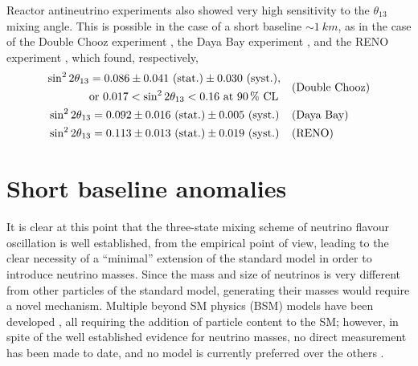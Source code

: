 Reactor antineutrino experiments also showed very high sensitivity to the $\theta_{13}$ mixing angle. This is possible in the case of a short baseline $\sim \SI{1}{km}$, as in the case of the Double Chooz experiment \cite{abeIndicationDisappearanceReactor2012}, the Daya Bay experiment \cite{anObservationElectronantineutrinoDisappearance2012}, and the RENO experiment \cite{kimObservationReactorElectron2012}, which found, respectively, \begin{align}
    &\begin{aligned}
        \sin^22\theta_{13} &= \mathrm{0.086 \pm 0.041\ (stat.) \pm 0.030\ (syst.)},\\
        & \text{or}\ 0.017 < \sin^22\theta_{13} < 0.16\ \text{at \SI{90}{\percent} CL}
    \end{aligned} && \text{(Double Chooz)}\\
    &\sin^22\theta_{13} = \mathrm{0.092 \pm 0.016\ (stat.) \pm 0.005\ (syst.)} && \text{(Daya Bay)}\\
    &\sin^22\theta_{13} = \mathrm{0.113 \pm 0.013\ (stat.) \pm 0.019\ (syst.)} && \text{(RENO)}
\end{align} 

\section{Short baseline anomalies}\label{sec:anomalies}

It is clear at this point that the three-state mixing scheme of neutrino flavour oscillation is well established, from the empirical point of view, leading to the clear necessity of a ``minimal'' extension of the standard model in order to introduce neutrino masses. Since the mass and size of neutrinos is very different from other particles of the standard model, generating their masses would require a novel mechanism. Multiple beyond SM physics (BSM) models have been developed \cite{navasReviewParticlePhysics2024, Arguelles:2019xgp}, all requiring the addition of particle content to the SM; however, in spite of the well established evidence for neutrino masses, no direct measurement has been made to date, and no model is currently preferred over the others \cite{navasReviewParticlePhysics2024}. 

